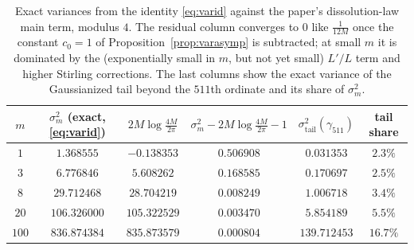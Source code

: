 \begin{table}[h]\centering
\begin{tabular}{cccccc}
\toprule
$m$ & $\sigma_m^2$ (exact, \eqref{eq:varid}) &
$2M\log\frac{4M}{2\pi}$ &
$\sigma_m^2-2M\log\frac{4M}{2\pi}-1$ &
$\sigma^2_{\mathrm{tail}}(\gamma_{511})$ & tail share\\
\midrule
$1$   & $1.368555$   & $-0.138353$  & $0.506908$ & $0.031353$   & $2.3\%$\\
$3$   & $6.776846$   & $5.608262$   & $0.168585$ & $0.170697$   & $2.5\%$\\
$8$   & $29.712468$  & $28.704219$  & $0.008249$ & $1.006718$   & $3.4\%$\\
$20$  & $106.326000$ & $105.322529$ & $0.003470$ & $5.854189$   & $5.5\%$\\
$100$ & $836.874384$ & $835.873579$ & $0.000804$ & $139.712453$ & $16.7\%$\\
\bottomrule
\end{tabular}
\caption{Exact variances from the identity \eqref{eq:varid} against
the paper's dissolution-law main term, modulus $4$. The residual
column converges to $0$ like $\tfrac1{12M}$ once the constant $c_0=1$
of Proposition~\ref{prop:varasymp} is subtracted; at small $m$ it is
dominated by the (exponentially small in $m$, but not yet small)
$L'/L$ term and higher Stirling corrections. The last columns show the
exact variance of the Gaussianized tail beyond the $511$th ordinate
and its share of $\sigma_m^2$.}
\label{tab:varexact}
\end{table}
